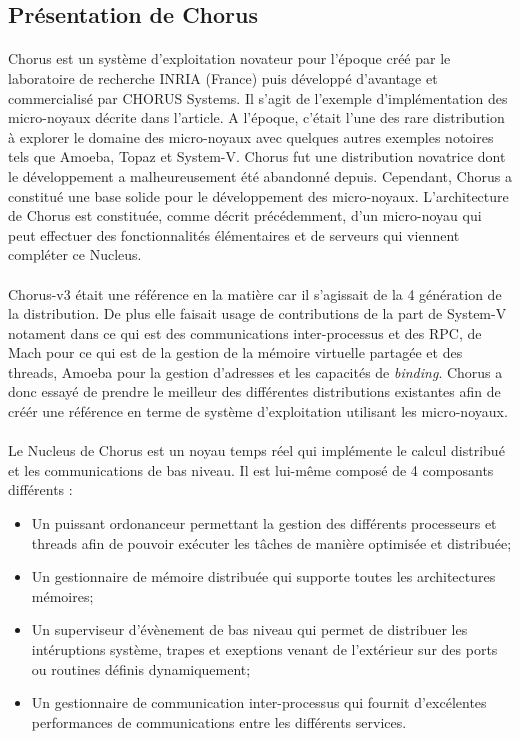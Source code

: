 \documentclass[a4paper, 12pt]{article}
\begin{document}
\subsection{Présentation de Chorus}
\paragraph{}
Chorus est un système d'exploitation novateur pour l'époque créé par le laboratoire de recherche INRIA (France) puis développé d'avantage et commercialisé par CHORUS Systems. Il s'agit de l'exemple d'implémentation des micro-noyaux décrite dans l'article. A l'époque, c'était l'une des rare distribution à explorer le domaine des micro-noyaux avec quelques autres exemples notoires tels que Amoeba, Topaz et System-V. Chorus fut une distribution novatrice dont le développement a malheureusement été abandonné depuis. Cependant, Chorus a constitué une base solide pour le développement des micro-noyaux. L'architecture de Chorus est constituée, comme décrit précédemment, d'un micro-noyau qui peut effectuer des fonctionnalités élémentaires et de serveurs qui viennent compléter ce Nucleus. 
\paragraph{}
Chorus-v3 était une référence en la matière car il s'agissait de la 4 génération de la distribution. De plus elle faisait usage de contributions de la part de System-V notament dans ce qui est des communications inter-processus et des RPC, de Mach pour ce qui est de la gestion de la mémoire virtuelle partagée et des threads, Amoeba pour la gestion d'adresses et les capacités de \emph{binding}. Chorus a donc essayé de prendre le meilleur des différentes distributions existantes afin de créér une référence en terme de système d'exploitation utilisant les micro-noyaux.

\paragraph{}
Le Nucleus de Chorus est un noyau temps réel qui implémente le calcul distribué et les communications de bas niveau. Il est lui-même composé de 4 composants différents :
\begin{itemize}
	\item Un puissant ordonanceur permettant la gestion des différents processeurs et threads afin de pouvoir exécuter les tâches de manière optimisée et distribuée;
	\item Un gestionnaire de mémoire distribuée qui supporte toutes les architectures mémoires;
	\item Un superviseur d'évènement de bas niveau qui permet de distribuer les intéruptions système, trapes et exeptions venant de l'extérieur sur des ports ou routines définis dynamiquement;
	\item Un gestionnaire de communication inter-processus qui fournit d'excélentes performances de communications entre les différents services.
\end{itemize}
\end{document}

